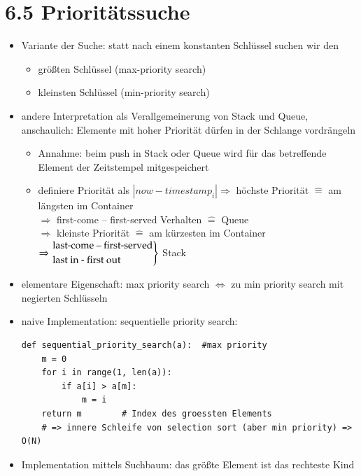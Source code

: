\section*{6.5 Prioritätssuche}
\begin{itemize}
    \item Variante der Suche: statt nach einem konstanten Schlüssel suchen wir den
    \begin{itemize}
        \item größten Schlüssel (max-priority search)
        \item kleinsten Schlüssel (min-priority search)
    \end{itemize}
    \item andere Interpretation als Verallgemeinerung von Stack und Queue, anschaulich: Elemente mit hoher Priorität dürfen in der Schlange vordrängeln
    \begin{itemize}
        \item Annahme: beim push in Stack oder Queue wird für das betreffende Element der Zeitstempel mitgespeichert
        \item definiere Priorität als $| now - timestamp_i| \Rightarrow$ höchste Priorität $\widehat{=}$ am längsten im Container \\
        \hspace*{1cm} $\Rightarrow$ first-come – first-served Verhalten $\widehat{=}$ Queue \\
        $\Rightarrow$ kleinste Priorität $\widehat{=}$ am kürzesten im Container $\Rightarrow \begin{rcases} \text{last-come – first-served} \\
            \text{last in - first out}\end{rcases}$ Stack
    \end{itemize}
        \item elementare Eigenschaft: max priority search $\Leftrightarrow$ zu min priority search mit negierten Schlüsseln
        \item naive Implementation: sequentielle priority search:
        \begin{verbatim}
def sequential_priority_search(a):  #max priority
    m = 0
    for i in range(1, len(a)):
        if a[i] > a[m]:
            m = i
    return m        # Index des groessten Elements
    # => innere Schleife von selection sort (aber min priority) => O(N)
        \end{verbatim}
        \item Implementation mittels Suchbaum: das größte Element ist das \glqq rechteste Kind\grqq

\end{itemize}
